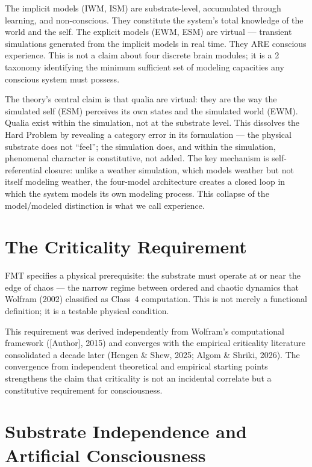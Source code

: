 \documentclass[11pt,a4paper]{article}
\begin{document}
The implicit models (IWM, ISM) are substrate-level, accumulated through learning, and non-conscious. They constitute the system's total knowledge of the world and the self. The explicit models (EWM, ESM) are virtual --- transient simulations generated from the implicit models in real time. They ARE conscious experience. This is not a claim about four discrete brain modules; it is a 2 taxonomy identifying the minimum sufficient set of modeling capacities any conscious system must possess.

The theory's central claim is that qualia are virtual: they are the way the simulated self (ESM) perceives its own states and the simulated world (EWM). Qualia exist within the simulation, not at the substrate level. This dissolves the Hard Problem by revealing a category error in its formulation --- the physical substrate does not ``feel''; the simulation does, and within the simulation, phenomenal character is constitutive, not added. The key mechanism is self-referential closure: unlike a weather simulation, which models weather but not itself modeling weather, the four-model architecture creates a closed loop in which the system models its own modeling process. This collapse of the model/modeled distinction is what we call experience.

\section{The Criticality Requirement}

FMT specifies a physical prerequisite: the substrate must operate at or near the edge of chaos --- the narrow regime between ordered and chaotic dynamics that Wolfram (2002) classified as Class~4 computation. This is not merely a functional definition; it is a testable physical condition.

This requirement was derived independently from Wolfram's computational framework ([Author], 2015) and converges with the empirical criticality literature consolidated a decade later (Hengen \& Shew, 2025; Algom \& Shriki, 2026). The convergence from independent theoretical and empirical starting points strengthens the claim that criticality is not an incidental correlate but a constitutive requirement for consciousness.

\section{Substrate Independence and Artificial Consciousness}
\end{document}
